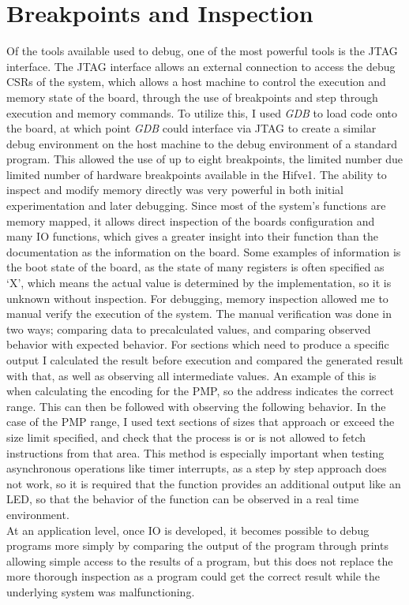\section{Breakpoints and Inspection}
Of the tools available used to debug, one of the most powerful tools is the JTAG interface. The JTAG interface allows an external connection to access the debug CSRs of the system, which allows a host machine to control the execution and memory state of the board, through the use of breakpoints and step through execution and memory commands. To utilize this, I used \textit{GDB} to load code onto the board, at which point \textit{GDB} could interface via JTAG to create a similar debug environment on the host machine to the debug environment of a standard program. This allowed the use of up to eight breakpoints, the limited number due limited number of hardware breakpoints available in the Hifve1. The ability to inspect and modify memory directly was very powerful in both initial experimentation and later debugging. Since most of the system's functions are memory mapped, it allows direct inspection of the boards configuration and many IO functions, which gives a greater insight into their function than the documentation as the information on the board. Some examples of information is the boot state of the board, as the state of many registers is often specified as `X', which means the actual value is determined by the implementation, so it is unknown without inspection. For debugging, memory inspection allowed me to manual verify the execution of the system. The manual verification was done in two ways; comparing data to precalculated values, and comparing observed behavior with expected behavior. For sections which need to produce a specific output I calculated the result before execution and compared the generated result with that, as well as observing all intermediate values. An example of this is when calculating the encoding for the PMP, so the address indicates the correct range. This can then be followed with observing the following behavior. In the case of the PMP range, I used text sections of sizes that approach or exceed the size limit specified, and check that the process is or is not allowed to fetch instructions from that area. This method is especially important when testing asynchronous operations like timer interrupts, as a step by step approach does not work, so it is required that the function provides an additional output like an LED, so that the behavior of the function can be observed in a real time environment.\\
At an application level, once IO is developed, it becomes possible to debug programs more simply by comparing the output of the program through prints allowing simple access to the results of a program, but this does not replace the more thorough inspection as a program could get the correct result while the underlying system was malfunctioning.

